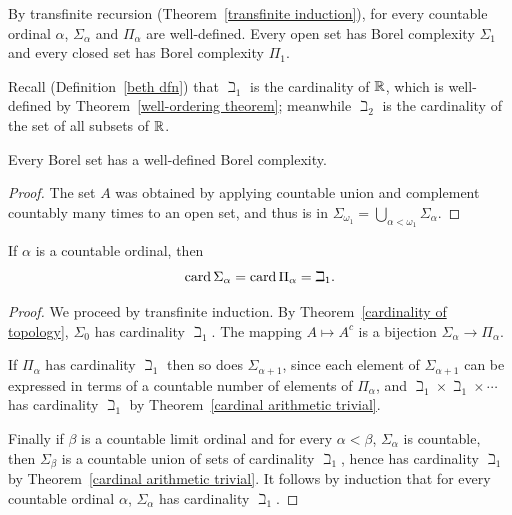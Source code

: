 \begin{subsec}
By transfinite recursion (Theorem~\ref{transfinite induction}), for every countable ordinal $\alpha$, $\Sigma_{\alpha}$ and $\Pi_{\alpha}$ are well-defined.
Every open set has Borel complexity $\Sigma_{1}$ and every closed set has Borel complexity $\Pi_{1}$.
\end{subsec}

\begin{subsec}
Recall (Definition~\ref{beth dfn}) that $\beth_{1}$ is the cardinality of $\mathbb{R}$, which is well-defined by Theorem~\ref{well-ordering theorem}; meanwhile $\beth_{2}$ is the cardinality of the set of all subsets of $\mathbb{R}$.
\end{subsec}

\begin{lemma}
Every Borel set has a well-defined Borel complexity.
\end{lemma}
\begin{proof}
The set $A$ was obtained by applying countable union and complement countably many times to an open set, and thus is in $\Sigma_{\omega_{1}} = \bigcup_{\alpha < \omega_{1}} \Sigma_{\alpha}$.
\end{proof}

\begin{lemma}
If $\alpha$ is a countable ordinal, then
$$\operatorname{card} \Sigma_{\alpha} = \operatorname{card} \Pi_{\alpha} = \beth_{1}.$$
\end{lemma}
\begin{proof}
We proceed by transfinite induction.
By Theorem~\ref{cardinality of topology}, $\Sigma_{0}$ has cardinality $\beth_{1}$.
The mapping $A \mapsto A^{c}$ is a bijection $\Sigma_{\alpha} \to \Pi_{\alpha}$.

If $\Pi_{\alpha}$ has cardinality $\beth_{1}$ then so does $\Sigma_{\alpha+1}$, since each element of $\Sigma_{\alpha+1}$ can be expressed in terms of a countable number of elements of $\Pi_{\alpha}$, and $\beth_{1} \times \beth_{1} \times \cdots$ has cardinality $\beth_{1}$ by Theorem~\ref{cardinal arithmetic trivial}.

Finally if $\beta$ is a countable limit ordinal and for every $\alpha < \beta$, $\Sigma_{\alpha}$ is countable, then $\Sigma_{\beta}$ is a countable union of sets of cardinality $\beth_{1}$, hence has cardinality $\beth_{1}$ by Theorem~\ref{cardinal arithmetic trivial}.
It follows by induction that for every countable ordinal $\alpha$, $\Sigma_{\alpha}$ has cardinality $\beth_{1}$.
\end{proof}


